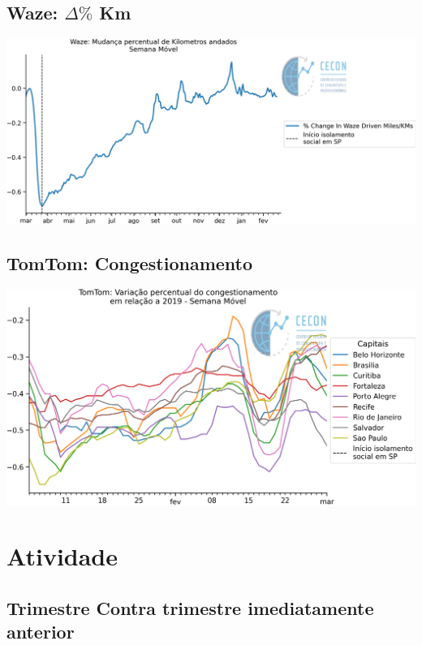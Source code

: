 \documentclass{SelfArx}
\begin{document}
\subsection*{Waze: \(\Delta \%\) Km}
\label{sec:org42650bd}

\begin{center}
\includegraphics[width=.9\linewidth]{./figs/Granulares/Waze_Brasil.png}
\end{center}

\subsection*{TomTom: Congestionamento}
\label{sec:orgb3f2bd5}

\begin{center}
\includegraphics[width=.9\linewidth]{./figs/Granulares/TomTom_Brasil.png}
\end{center}

\section*{Atividade}
\label{sec:org086af36}



\subsection*{Trimestre Contra trimestre imediatamente anterior}
\label{sec:orgdb4d554}
\end{document}
